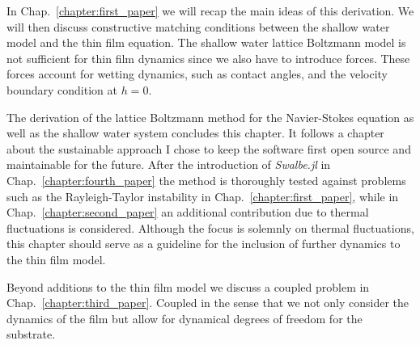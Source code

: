 In Chap.~\ref{chapter:first_paper} we will recap the main ideas of this derivation. 
We will then discuss constructive matching conditions between the shallow water model and the thin film equation.
The shallow water lattice Boltzmann model is not sufficient for thin film dynamics since we also have to introduce forces. 
These forces account for wetting dynamics, such as contact angles, and the velocity boundary condition at $h = 0$.

The derivation of the lattice Boltzmann method for the Navier-Stokes equation as well as the shallow water system concludes this chapter.
It follows a chapter about the sustainable approach I chose to keep the software first open source and maintainable for the future.
After the introduction of \textit{Swalbe.jl} in Chap.~\ref{chapter:fourth_paper} the method is thoroughly tested against problems such as the Rayleigh-Taylor instability in Chap.~\ref{chapter:first_paper}, while in Chap.~\ref{chapter:second_paper} an additional contribution due to thermal fluctuations is considered. 
Although the focus is solemnly on thermal fluctuations, this chapter should serve as a guideline for the inclusion of further dynamics to the thin film model.

Beyond additions to the thin film model we discuss a coupled problem in Chap.~\ref{chapter:third_paper}. 
Coupled in the sense that we not only consider the dynamics of the film but allow for dynamical degrees of freedom for the substrate.